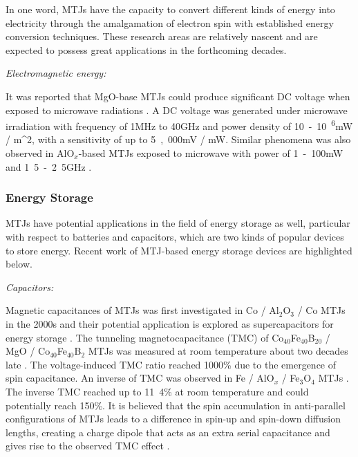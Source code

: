 \documentclass[molecules,review,submit,pdftex,moreauthors]{Definitions/mdpi}
\begin{document}
In one word, MTJs have the capacity to convert different kinds of energy into electricity through the amalgamation of electron spin with established energy conversion techniques. These research areas are relatively nascent and are expected to possess great applications in the forthcoming decades.


\noindent \emph{Electromagnetic energy:}


It was reported that MgO-base MTJs could produce significant DC voltage when exposed to microwave radiations \cite{Gui2015APL}.  A DC voltage was generated under microwave irradiation with frequency of \unit{1}{MHz} to \unit{40}{GHz} and power density of \unit{10 - 10 ^6}{mW / m^2}, with a sensitivity of up to \unit{5,000}{mV / mW}.  Similar phenomena was also observed in AlO$_x$-based MTJs exposed to  microwave with power of \unit{1 - 100}{mW} and \unit{1.5 - 2.5}{GHz} \cite{Fan2009APL}.  


\vspace{12pt}
\subsubsection{Energy Storage}


MTJs have potential applications in the field of energy storage as well, particular with respect to batteries and capacitors, which are two kinds of popular devices to store energy.  Recent work of MTJ-based energy storage devices are highlighted below.


\noindent \emph{Capacitors:}


Magnetic capacitances of MTJs was first investigated in Co / Al$_2$O$_3$ / Co MTJs in the 2000s and their potential application is explored as supercapacitors for energy storage \cite{Kaiju2002JAP}.  The tunneling magnetocapacitance (TMC) of Co$_{40}$Fe$_{40}$B$_{20}$ / MgO / Co$_{40}$Fe$_{40}$B$_2$ MTJs was measured at room temperature about two decades late \cite{Kaiju2015APL,Kaiju2018SR}.  The voltage-induced TMC ratio reached \unit{1000}{\%} due to the emergence of spin capacitance.  An inverse of TMC was observed in Fe / AlO$_x$ / Fe$_3$O$_4$ MTJs \cite{Kaiju2017SR}.  The inverse TMC reached up to \unit{11.4}{\%} at room temperature and could potentially reach \unit{150}{\%}.  It is believed that the spin accumulation in anti-parallel configurations of MTJs leads to a difference in spin-up and spin-down diffusion lengths, creating a charge dipole that acts as an extra serial capacitance and gives rise to the observed TMC effect \cite{Lee2015SR}.  
\end{document}
